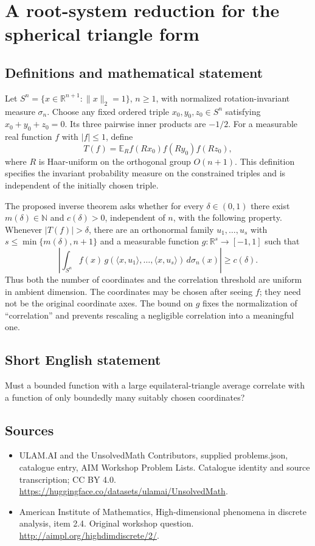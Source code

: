 \documentclass[11pt,a4paper]{article}
\begin{document}
\section*{A root-system reduction for the spherical triangle form}\label{statement}

\subsection{Definitions and mathematical statement}
Let $S^n=\{x\in\mathbb R^{n+1}:\|x\|_2=1\}$, $n\geq1$, with normalized rotation-invariant measure $\sigma_n$.
Choose any fixed ordered triple $x_0,y_0,z_0\in S^n$ satisfying $x_0+y_0+z_0=0$.
Its three pairwise inner products are $-1/2$.
For a measurable real function $f$ with $|f|\leq1$, define
\[
 T(f)=\mathbb E_R f(Rx_0)f(Ry_0)f(Rz_0),
\]
where $R$ is Haar-uniform on the orthogonal group $O(n+1)$.
This definition specifies the invariant probability measure on the constrained triples and is independent of the initially chosen triple.

The proposed inverse theorem asks whether for every $\delta\in(0,1)$ there exist $m(\delta)\in\mathbb N$ and $c(\delta)>0$, independent of $n$, with the following property.
Whenever $|T(f)|>\delta$, there are an orthonormal family $u_1,\ldots,u_s$ with $s\leq\min\{m(\delta),n+1\}$ and a measurable function $g:\mathbb R^s\to[-1,1]$ such that
\[
 \left|\int_{S^n}f(x)\,
 g(\langle x,u_1\rangle,\ldots,\langle x,u_s\rangle)
 \,d\sigma_n(x)\right|\geq c(\delta).
\]
Thus both the number of coordinates and the correlation threshold are uniform in ambient dimension.
The coordinates may be chosen after seeing $f$; they need not be the original coordinate axes.
The bound on $g$ fixes the normalization of ``correlation'' and prevents rescaling a negligible correlation into a meaningful one.
\subsection{Short English statement}
Must a bounded function with a large equilateral-triangle average correlate with a function of only boundedly many suitably chosen coordinates?
\subsection{Sources}
\begin{itemize}
\item[S1] ULAM.AI and the UnsolvedMath Contributors, supplied problems.json, catalogue entry, AIM Workshop Problem Lists. Catalogue identity and source transcription; CC BY 4.0.
\url{https://huggingface.co/datasets/ulamai/UnsolvedMath}.
\item[S2] American Institute of Mathematics, High-dimensional phenomena in discrete analysis, item 2.4. Original workshop question.
\url{http://aimpl.org/highdimdiscrete/2/}.
\end{itemize}
\end{document}
